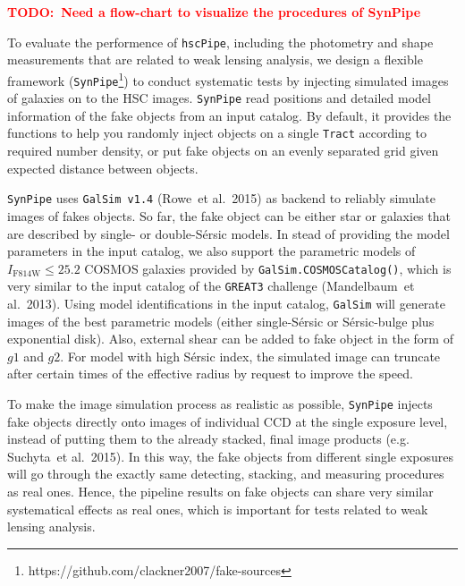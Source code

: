 \documentclass[preprint]{aastex}
\newcommand{\todo}[1]{\textcolor{red}{\textbf{TODO:~#1}}}
\begin{document}
    \todo{Need a flow-chart to visualize the procedures of SynPipe}

    To evaluate the performence of \texttt{hscPipe}, including the photometry and shape 
    measurements that are related to weak lensing analysis, we design a flexible framework 
    (\texttt{SynPipe}\footnote{https://github.com/clackner2007/fake-sources}) to conduct 
    systematic tests by injecting simulated images of galaxies on to the HSC images.  
    \texttt{SynPipe} read positions and detailed model information of the fake objects from an
    input catalog.  By default, it provides the functions to help you randomly inject objects 
    on a single \texttt{Tract} according to required number density, or put fake objects on 
    an evenly separated grid given expected distance between objects. 

    \texttt{SynPipe} uses \texttt{GalSim\ v1.4} (Rowe\ et al.\ 2015) as backend to reliably
    simulate images of fakes objects.  So far, the fake object can be either star or galaxies
    that are described by single- or double-{S\'{e}rsic} models.  In stead of providing the
    model parameters in the input catalog, we also support the parametric models of
    $I_{\mathrm{F814W}} \leq 25.2$ COSMOS galaxies provided by
    \texttt{GalSim.COSMOSCatalog()}, which is very similar to the input catalog of the
    \texttt{GREAT3} challenge (Mandelbaum\ et al.\ 2013).   Using model identifications in the
    input catalog, \texttt{GalSim} will generate images of the best parametric models (either
    single-{S\'{e}rsic} or {S\'{e}rsic}-bulge plus exponential disk).  Also, external shear
    can be added to fake object in the form of $g1$ and $g2$.  For model with high
    {S\'{e}rsic} index, the simulated image can truncate after certain times of the effective
    radius by request to improve the speed.  

    To make the image simulation process as realistic as possible, \texttt{SynPipe} injects
    fake objects directly onto images of individual CCD at the single exposure level, instead
    of putting them to the already stacked, final image products (e.g. Suchyta\ et al.\ 2015).
    In this way, the fake objects from different single exposures will go through the exactly
    same detecting, stacking, and measuring procedures as real ones.  Hence, the pipeline
    results on fake objects can share very similar systematical effects as real ones, which is
    important for tests related to weak lensing analysis. 
\end{document}
